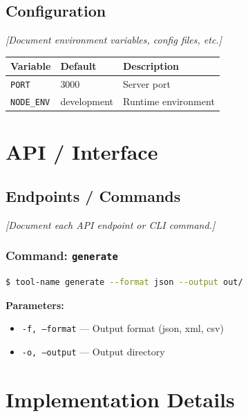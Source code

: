 \documentclass[11pt,a4paper]{report}
\begin{document}
\section{Configuration}
\textit{[Document environment variables, config files, etc.]}

\begin{longtable}{@{}llp{6cm}@{}}
\toprule
\textbf{Variable} & \textbf{Default} & \textbf{Description} \\
\midrule
\texttt{PORT} & 3000 & Server port \\
\texttt{NODE\_ENV} & development & Runtime environment \\
\bottomrule
\end{longtable}

\chapter{API / Interface}

\section{Endpoints / Commands}
\textit{[Document each API endpoint or CLI command.]}

\subsection{Command: \texttt{generate}}
\begin{lstlisting}[language=bash]
$ tool-name generate --format json --output out/
\end{lstlisting}

\textbf{Parameters:}
\begin{itemize}[leftmargin=2em]
    \item \texttt{-f, --format} — Output format (json, xml, csv)
    \item \texttt{-o, --output} — Output directory
\end{itemize}

\chapter{Implementation Details}
\end{document}
